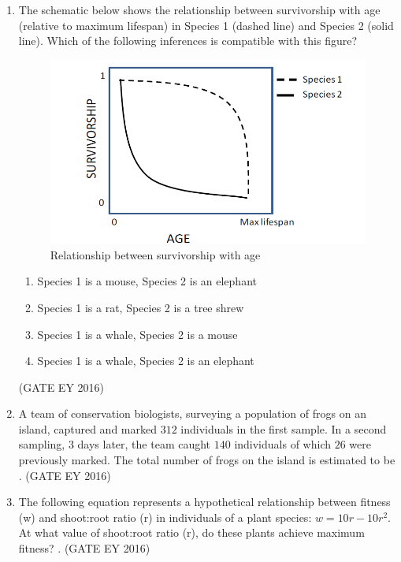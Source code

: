 \documentclass[journal]{IEEEtran}
\begin{document}
\begin{enumerate}[label=Q.\arabic*.]
\item The schematic below shows the relationship between survivorship with age (relative to maximum lifespan) in Species 1 (dashed line) and Species 2 (solid line). Which of the following inferences is compatible with this figure? 
\begin{figure}
    \centering
    \includegraphics[width=0.7\linewidth]{figs/Q-52.png}
    \caption{Relationship between survivorship with age}
    \label{Fig.7}
\end{figure}
\begin{enumerate}
    \item Species 1 is a mouse, Species 2 is an elephant
    \item Species 1 is a rat, Species 2 is a tree shrew
    \item Species 1 is a whale, Species 2 is a mouse
    \item Species 1 is a whale, Species 2 is an elephant
\end{enumerate}
\hfill{(GATE EY 2016)}

\item A team of conservation biologists, surveying a population of frogs on an island, captured and marked $312$ individuals in the first sample. In a second sampling, $3$ days later, the team caught $140$ individuals of which $26$ were previously marked. The total number of frogs on the island is estimated to be \underline{\hspace{3cm}}.
\hfill{(GATE EY 2016)}
\bigskip
 
\item The following equation represents a hypothetical relationship between fitness (w) and shoot:root ratio (r) in individuals of a plant species: $w = 10r - 10r^2$. At what value of shoot:root ratio (r), do these plants achieve maximum fitness? \underline{\hspace{3cm}}.
\hfill{(GATE EY 2016)}
\bigskip
 

\end{enumerate}
\end{document}
